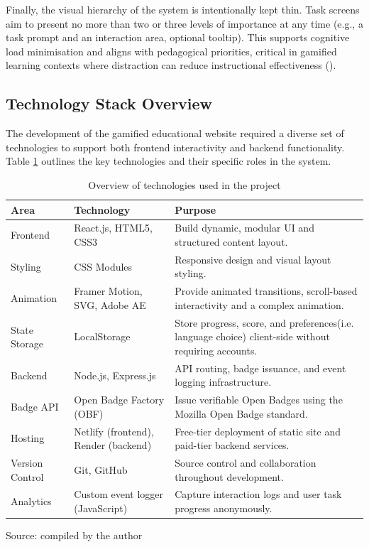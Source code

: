 Finally, the visual hierarchy of the system is intentionally kept thin. 
Task screens aim to present no more than two or three levels of importance at any time (e.g., a task prompt and an interaction area, optional tooltip). 
This supports cognitive load minimisation and aligns with pedagogical priorities, critical in gamified learning contexts where distraction can reduce instructional effectiveness (\cite{reduceDistraction}).

\subsection{Technology Stack Overview}

The development of the gamified educational website required a diverse set of technologies to support both frontend interactivity and backend functionality. 
Table \ref{tab:tech_stack} outlines the key technologies and their specific roles in the system.

\begin{table}[H]
\centering
\captionsetup{justification=raggedright, singlelinecheck=false}
\caption{Overview of technologies used in the project}
\renewcommand{\arraystretch}{1.3}
\begin{tabularx}{\textwidth}{|l|l|X|}
\hline
\textbf{Area} & \textbf{Technology} & \textbf{Purpose} \\
\hline
Frontend & React.js, HTML5, CSS3 & Build dynamic, modular UI and structured content layout. \\
\hline
Styling & CSS Modules & Responsive design and visual layout styling. \\
\hline
Animation & Framer Motion, SVG, Adobe AE & Provide animated transitions, scroll-based interactivity and a complex animation. \\
\hline
State Storage & LocalStorage & Store progress, score, and preferences(i.e. language choice) client-side without requiring accounts. \\
\hline
Backend & Node.js, Express.js & API routing, badge issuance, and event logging infrastructure. \\
\hline
Badge API & Open Badge Factory (OBF) & Issue verifiable Open Badges using the Mozilla Open Badge standard. \\
\hline
Hosting & Netlify (frontend), Render (backend) & Free-tier deployment of static site and paid-tier backend services. \\
\hline
Version Control & Git, GitHub & Source control and collaboration throughout development. \\
\hline
Analytics & Custom event logger (JavaScript) & Capture interaction logs and user task progress anonymously. \\
\hline
\end{tabularx}
\label{tab:tech_stack}
\end{table}
 {\raggedright \small{Source: compiled by the author}\par}

